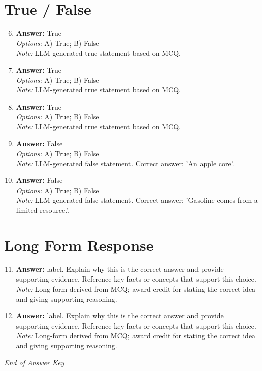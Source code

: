 \documentclass[12pt]{article}
\begin{document}
\section*{True / False}
\begin{enumerate}[label=\arabic*.]
\setcounter{enumi}{5}
\item \textbf{Answer:} True
\\ \textit{Options:} A) True; B) False
\\ \textit{Note:} LLM-generated true statement based on MCQ.
\item \textbf{Answer:} True
\\ \textit{Options:} A) True; B) False
\\ \textit{Note:} LLM-generated true statement based on MCQ.
\item \textbf{Answer:} True
\\ \textit{Options:} A) True; B) False
\\ \textit{Note:} LLM-generated true statement based on MCQ.
\item \textbf{Answer:} False
\\ \textit{Options:} A) True; B) False
\\ \textit{Note:} LLM-generated false statement. Correct answer: 'An apple core'.
\item \textbf{Answer:} False
\\ \textit{Options:} A) True; B) False
\\ \textit{Note:} LLM-generated false statement. Correct answer: 'Gasoline comes from a limited resource.'.
\end{enumerate}

\section*{Long Form Response}
\begin{enumerate}[label=\arabic*.]
\setcounter{enumi}{10}
\item \textbf{Answer:} label. Explain why this is the correct answer and provide supporting evidence. Reference key facts or concepts that support this choice.
\\ \textit{Note:} Long-form derived from MCQ; award credit for stating the correct idea and giving supporting reasoning.
\item \textbf{Answer:} label. Explain why this is the correct answer and provide supporting evidence. Reference key facts or concepts that support this choice.
\\ \textit{Note:} Long-form derived from MCQ; award credit for stating the correct idea and giving supporting reasoning.
\end{enumerate}

\vfill
\noindent\textit{End of Answer Key}
\end{document}
